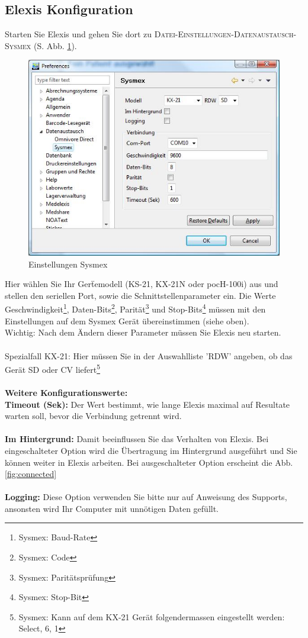 \documentclass[a4paper]{scrartcl}
\begin{document}
\subsection{Elexis Konfiguration}
Starten Sie Elexis und gehen Sie dort zu \textsc{Datei-Einstellungen-Datenaustausch-Sysmex} (S. Abb. \ref{fig:config}).
\begin{figure}[h]
    \includegraphics{config}
    \caption{Einstellungen Sysmex}
    \label{fig:config}
\end{figure}
Hier w\"ahlen Sie Ihr Ger\"temodell (KS-21, KX-21N oder pocH-100i) aus und stellen den seriellen Port, sowie die Schnittstellenparameter ein. Die Werte Geschwindigkeit\footnote{Sysmex: Baud-Rate}, Daten-Bits\footnote{Sysmex: Code}, Parit\"at\footnote{Sysmex: Parit\"atspr\"ufung} und Stop-Bits\footnote{Sysmex: Stop-Bit} m\"ussen mit den Einstellungen auf dem Sysmex Ger\"at \"ubereinstimmen (siehe oben).\\
Wichtig: Nach dem \"Andern dieser Parameter m\"ussen Sie Elexis neu starten.\\
\\
Spezialfall KX-21: Hier m\"ussen Sie in der Auswahlliste 'RDW' angeben, ob das Ger\"at SD oder CV liefert\footnote{Sysmex: Kann auf dem KX-21 Ger\"at folgendermassen eingestellt werden: Select, 6, 1}\\
\\
\textbf{Weitere Konfigurationswerte:}\\
\textbf{Timeout (Sek):} Der Wert bestimmt, wie lange Elexis maximal auf Resultate warten soll, bevor die Verbindung getrennt wird.\\
\\
\textbf{Im Hintergrund:} Damit beeinflussen Sie das Verhalten von Elexis. Bei eingeschalteter Option wird die \"Ubertragung im Hintergrund ausgef\"uhrt und Sie k\"onnen weiter in Elexis arbeiten. Bei ausgeschalteter Option erscheint die Abb. \ref{fig:connected}\\
\\
\textbf{Logging:} Diese Option verwenden Sie bitte nur auf Anweisung des Supports, ansonsten wird Ihr Computer mit unn\"otigen Daten gef\"ullt.\\
\end{document}
